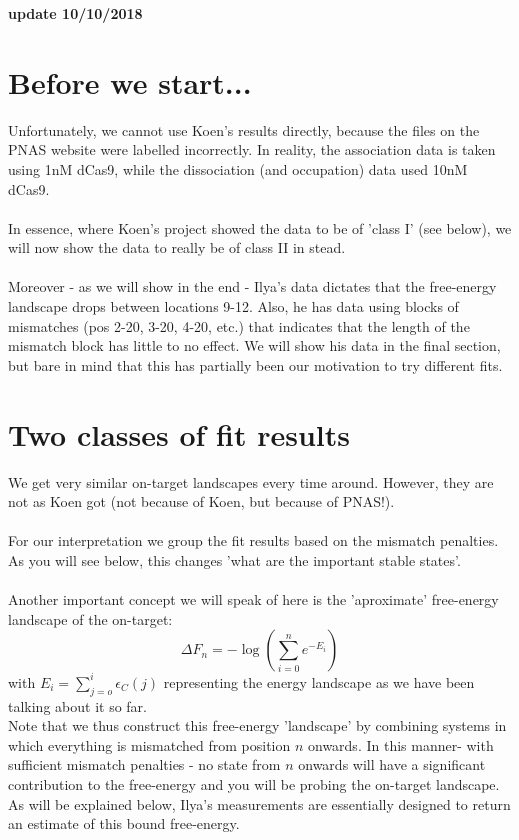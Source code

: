 \documentclass[a4paper,twoside]{revtex4-1}
\begin{document}
\begin{center}
{\bf \Large {update 10/10/2018}}
\end{center}


\section*{Before we start...}
Unfortunately, we cannot use Koen's results directly, because the files on the PNAS website were labelled incorrectly. In reality, the association data is taken using 1nM dCas9, while the dissociation (and occupation) data used 10nM dCas9. 
\\ \\
In essence, where Koen's project showed the data to be of 'class I' (see below), we will now show the data to really be of class II in stead. 
\\ \\ 
Moreover - as we will show in the end - Ilya's data dictates that the free-energy landscape drops between locations 9-12. Also, he has data using blocks of mismatches (pos 2-20, 3-20, 4-20, etc.) that indicates that the length of the mismatch block has little to no effect. 
We will show his data in the final section, but bare in mind that this has partially been our motivation to try different fits. 


\section{Two classes of fit results}
We get very similar on-target landscapes every time around. However, they are not as Koen got (not because of Koen, but because of PNAS!). \\
\\ 
For our interpretation we group the fit results based on the mismatch penalties. As you will see below, this changes 'what are the important stable states'. 
\\ \\ 
Another important concept we will speak of here is the 'aproximate' free-energy landscape of the on-target:
\begin{equation}
\Delta F_n = -\log \left( \sum_{i=0}^{n} e^{-E_i}\right)
\end{equation}
with $E_i = \sum_{j=o}^{i} \epsilon_C(j)$ representing the energy landscape as we have been talking about it so far. \\
Note that we thus construct this free-energy 'landscape' by combining systems in which everything is mismatched from position $n$ onwards. In this manner- with sufficient mismatch penalties - no state from $n$ onwards will have a significant contribution to the free-energy and you will be probing the on-target landscape. \\
As will be explained below, Ilya's measurements are essentially designed to return an estimate of this bound free-energy. 
\end{document}
